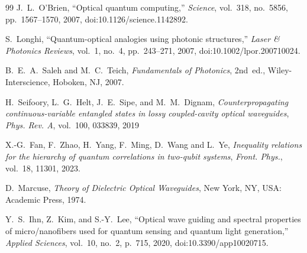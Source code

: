 \begin{thebibliography}{99}
	J.~L.~O'Brien,
	``Optical quantum computing,''
	\textit{Science},
	vol.~318, no.~5856, pp.~1567--1570, 2007,
	doi:10.1126/science.1142892.
	
	S.~Longhi,
	``Quantum-optical analogies using photonic structures,''
	\textit{Laser \& Photonics Reviews},
	vol.~1, no.~4, pp.~243--271, 2007,
	doi:10.1002/lpor.200710024.
	
	B.~E.~A.~Saleh and M.~C.~Teich,
	\textit{Fundamentals of Photonics},
	2nd~ed.,
	Wiley-Interscience, Hoboken, NJ, 2007.
	
	H.~Seifoory, L.~G.~Helt, J.~E.~Sipe, and M.~M.~Dignam,
	\textit{Counterpropagating continuous-variable entangled states in lossy coupled-cavity optical waveguides},
	\textit{Phys. Rev. A}, vol.~100, 033839, 2019
	
	X.-G.~Fan, F.~Zhao, H.~Yang, F.~Ming, D.~Wang and L.~Ye,
	\textit{Inequality relations for the hierarchy of quantum correlations in two-qubit systems},
	\textit{Front. Phys.}, vol.~18, 11301, 2023.

    D.~Marcuse, \textit{Theory of Dielectric Optical Waveguides}, New York, NY, USA: Academic Press, 1974.

    Y.~S.~Ihn, Z.~Kim, and S.-Y.~Lee, ``Optical wave guiding and spectral properties of micro/nanofibers used for quantum sensing and quantum light generation,'' \textit{Applied Sciences}, vol.~10, no.~2, p.~715, 2020, doi:10.3390/app10020715.
\end{thebibliography}